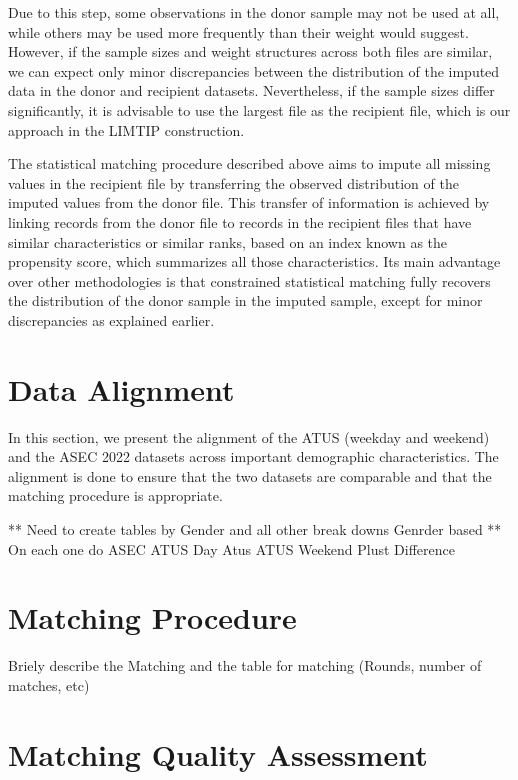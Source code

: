 \documentclass[
  11pt,
]{article}
\begin{document}
Due to this step, some observations in the donor sample may not be used
at all, while others may be used more frequently than their weight would
suggest. However, if the sample sizes and weight structures across both
files are similar, we can expect only minor discrepancies between the
distribution of the imputed data in the donor and recipient datasets.
Nevertheless, if the sample sizes differ significantly, it is advisable
to use the largest file as the recipient file, which is our approach in
the LIMTIP construction.

The statistical matching procedure described above aims to impute all
missing values in the recipient file by transferring the observed
distribution of the imputed values from the donor file. This transfer of
information is achieved by linking records from the donor file to
records in the recipient files that have similar characteristics or
similar ranks, based on an index known as the propensity score, which
summarizes all those characteristics. Its main advantage over other
methodologies is that constrained statistical matching fully recovers
the distribution of the donor sample in the imputed sample, except for
minor discrepancies as explained earlier.

\section{Data Alignment}\label{data-alignment}

In this section, we present the alignment of the ATUS (weekday and
weekend) and the ASEC 2022 datasets across important demographic
characteristics. The alignment is done to ensure that the two datasets
are comparable and that the matching procedure is appropriate.

** Need to create tables by Gender and all other break downs Genrder
based ** On each one do ASEC ATUS Day Atus ATUS Weekend Plust Difference

\section{Matching Procedure}\label{matching-procedure}

Briely describe the Matching and the table for matching (Rounds, number
of matches, etc)

\section{Matching Quality Assessment}\label{matching-quality-assessment}
\end{document}
